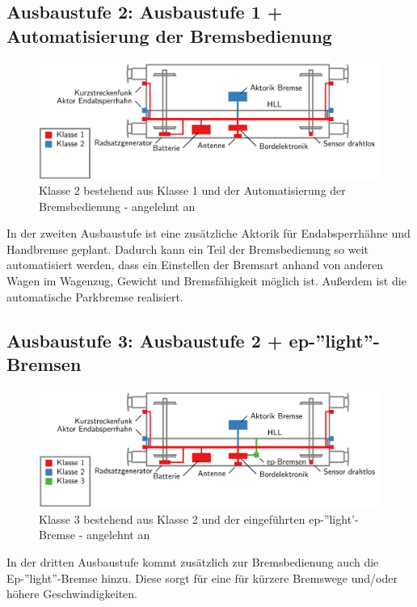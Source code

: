 \subsection{Ausbaustufe 2: Ausbaustufe 1 + Automatisierung der Bremsbedienung}
\begin{figure}[htbp] 
    \includegraphics[width=\textwidth]{Bilder/Ausbaustufen_2.PNG}
    \caption{Klasse 2 bestehend aus Klasse 1 und der Automatisierung der Bremsbedienung - angelehnt an \cite{ETR_3}}
    \label{fig:Klasse2}
\end{figure} 
In der zweiten Ausbaustufe ist eine zusätzliche Aktorik für Endabsperrhähne und Handbremse geplant. Dadurch kann ein Teil der Bremsbedienung so weit automatisiert werden, dass ein Einstellen der Bremsart anhand von anderen Wagen im Wagenzug, Gewicht und Bremsfähigkeit möglich ist. Außerdem ist die automatische Parkbremse realisiert.\par
\subsection{Ausbaustufe 3: Ausbaustufe 2 + ep-''light''-Bremsen}
\begin{figure}[htbp] 
    \includegraphics[width=\textwidth]{Bilder/Ausbaustufen_3.PNG}
    \caption{Klasse 3 bestehend aus Klasse 2 und der eingeführten ep-''light'-Bremse - angelehnt an \cite{ETR_3}}
    \label{fig:Klasse3}
\end{figure} 
In der dritten Ausbaustufe kommt zusätzlich zur Bremsbedienung auch die Ep-''light''-Bremse hinzu. Diese sorgt für eine für kürzere Bremswege und/oder höhere Geschwindigkeiten.\par
